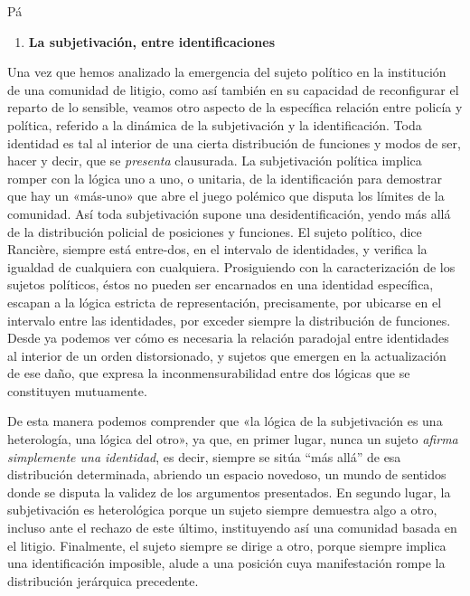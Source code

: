 Pá

\begin{enumerate}
\def\labelenumi{\arabic{enumi}.}
\item
  \textbf{La subjetivación, entre identificaciones}
\end{enumerate}

Una vez que hemos analizado la emergencia del sujeto político en la institución de una comunidad de litigio, como así también en su capacidad de reconfigurar el reparto de lo sensible, veamos otro aspecto de la específica relación entre policía y política, referido a la dinámica de la subjetivación y la identificación. Toda identidad es tal al interior de una cierta distribución de funciones y modos de ser, hacer y decir, que se \emph{presenta} clausurada. La subjetivación política implica romper con la lógica uno a uno, o unitaria, de la identificación para demostrar que hay un «más-uno» que abre el juego polémico que disputa los límites de la comunidad. Así toda subjetivación supone una desidentificación, yendo más allá de la distribución policial de posiciones y funciones. El sujeto político, dice Rancière, siempre está entre-dos, en el intervalo de identidades, y verifica la igualdad de cualquiera con cualquiera. Prosiguiendo con la caracterización de los sujetos políticos, éstos no pueden ser encarnados en una identidad específica, escapan a la lógica estricta de representación, precisamente, por ubicarse en el intervalo entre las identidades, por exceder siempre la distribución de funciones. Desde ya podemos ver cómo es necesaria la relación paradojal entre identidades al interior de un orden distorsionado, y sujetos que emergen en la actualización de ese daño, que expresa la inconmensurabilidad entre dos lógicas que se constituyen mutuamente.

De esta manera podemos comprender que «la lógica de la subjetivación es una heterología, una lógica del otro», ya que, en primer lugar, nunca un sujeto \emph{afirma simplemente una identidad}, es decir, siempre se sitúa ``más allá'' de esa distribución determinada, abriendo un espacio novedoso, un mundo de sentidos donde se disputa la validez de los argumentos presentados. En segundo lugar, la subjetivación es heterológica porque un sujeto siempre demuestra algo a otro, incluso ante el rechazo de este último, instituyendo así una comunidad basada en el litigio. Finalmente, el sujeto siempre se dirige a otro, porque siempre implica una identificación imposible, alude a una posición cuya manifestación rompe la distribución jerárquica precedente.

